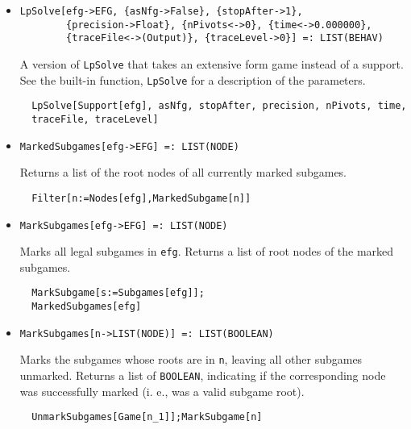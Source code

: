 \begin{itemize}
\item{}
\protect \large \begin{verbatim}
LpSolve[efg->EFG, {asNfg->False}, {stopAfter->1},
        {precision->Float}, {nPivots<->0}, {time<->0.000000}, 
        {traceFile<->(Output)}, {traceLevel->0}] =: LIST(BEHAV) 
\end{verbatim}\normalsize

\bd 
A version of \verb+LpSolve+ that takes an extensive form
game instead of a support.  See the built-in function,
\verb+LpSolve+ for a description of the parameters.
\begin{verbatim}
  LpSolve[Support[efg], asNfg, stopAfter, precision, nPivots, time, 
  traceFile, traceLevel]
\end{verbatim} 
\ed


\item{}
\protect \large \begin{verbatim}
MarkedSubgames[efg->EFG] =: LIST(NODE) 
\end{verbatim}\normalsize

\bd 
Returns a list of the root nodes of all currently marked subgames.  
\begin{verbatim}
  Filter[n:=Nodes[efg],MarkedSubgame[n]]
\end{verbatim} 
\ed

\item{}
\protect \large \begin{verbatim}
MarkSubgames[efg->EFG] =: LIST(NODE) 
\end{verbatim}\normalsize

\bd 
Marks all legal subgames in \verb+efg+.  Returns a list of root nodes
of the marked subgames.  
\begin{verbatim}
  MarkSubgame[s:=Subgames[efg]];
  MarkedSubgames[efg]
\end{verbatim} 
\ed


\item{}
\protect \large \begin{verbatim}
MarkSubgames[n->LIST(NODE)] =: LIST(BOOLEAN) 
\end{verbatim}\normalsize

\bd 
Marks the subgames whose roots are in \verb+n+, leaving all other
subgames unmarked.  Returns a list of \verb+BOOLEAN+, indicating if
the corresponding node was successfully marked (i. e., was a valid
subgame root).
\begin{verbatim}
  UnmarkSubgames[Game[n_1]];MarkSubgame[n]
\end{verbatim} 
\ed


\end{itemize}
